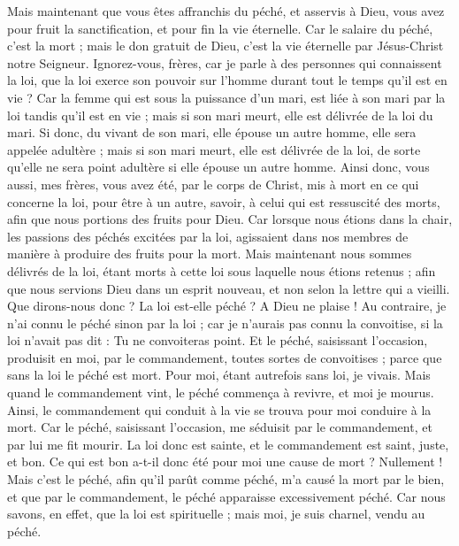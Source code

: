 \begin{multicols}{2}
Mais maintenant que vous êtes affranchis du péché, et asservis à Dieu, vous avez pour fruit la sanctification, et pour fin la vie éternelle.
Car le salaire du péché, c'est la mort ; mais le don gratuit de Dieu, c'est la vie éternelle par Jésus-Christ notre Seigneur.
\VerseOne{}Ignorez-vous, frères, car je parle à des personnes qui connaissent la loi, que la loi exerce son pouvoir sur l'homme durant tout le temps qu'il est en vie ?
Car la femme qui est sous la puissance d'un mari, est liée à son mari par la loi tandis qu'il est en vie ; mais si son mari meurt, elle est délivrée de la loi du mari.
Si donc, du vivant de son mari, elle épouse un autre homme, elle sera appelée adultère ; mais si son mari meurt, elle est délivrée de la loi, de sorte qu'elle ne sera point adultère si elle épouse un autre homme.
Ainsi donc, vous aussi, mes frères, vous avez été, par le corps de Christ, mis à mort en ce qui concerne la loi, pour être à un autre, savoir, à celui qui est ressuscité des morts, afin que nous portions des fruits pour Dieu.
Car lorsque nous étions dans la chair, les passions des péchés excitées par la loi, agissaient dans nos membres de manière à produire des fruits pour la mort.
Mais maintenant nous sommes délivrés de la loi, étant morts à cette loi sous laquelle nous étions retenus ; afin que nous servions Dieu dans un esprit nouveau, et non selon la lettre qui a vieilli.
Que dirons-nous donc ? La loi est-elle péché ? A Dieu ne plaise ! Au contraire, je n'ai connu le péché sinon par la loi ; car je n'aurais pas connu la convoitise, si la loi n'avait pas dit : Tu ne convoiteras point.
Et le péché, saisissant l'occasion, produisit en moi, par le commandement, toutes sortes de convoitises ; parce que sans la loi le péché est mort.
Pour moi, étant autrefois sans loi, je vivais. Mais quand le commandement vint, le péché commença à revivre, et moi je mourus.
Ainsi, le commandement qui conduit à la vie se trouva pour moi conduire à la mort.
Car le péché, saisissant l'occasion, me séduisit par le commandement, et par lui me fit mourir.
La loi donc est sainte, et le commandement est saint, juste, et bon.
Ce qui est bon a-t-il donc été pour moi une cause de mort ? Nullement ! Mais c'est le péché, afin qu'il parût comme péché, m'a causé la mort par le bien, et que par le commandement, le péché apparaisse excessivement péché.
Car nous savons, en effet, que la loi est spirituelle ; mais moi, je suis charnel, vendu au péché.

\end{multicols}

